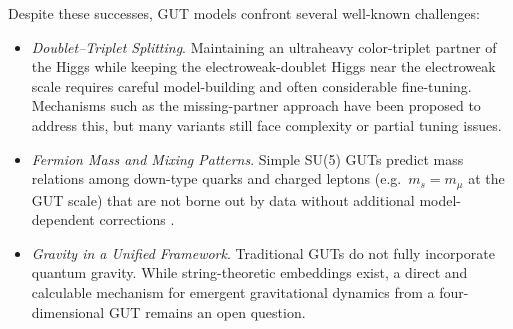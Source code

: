 \documentclass[aps,prd,preprint,groupedaddress]{revtex4-2}
\begin{document}
Despite these successes, GUT models confront several well-known challenges:
\begin{itemize}
    \item \emph{Doublet--Triplet Splitting}. Maintaining an ultraheavy color-triplet partner of the Higgs while keeping the electroweak-doublet Higgs near the electroweak scale requires careful model-building and often considerable fine-tuning.  Mechanisms such as the missing-partner approach \cite{dimopoulos1982missing} have been proposed to address this, but many variants still face complexity or partial tuning issues.
    \item \emph{Fermion Mass and Mixing Patterns}. Simple SU(5) GUTs predict mass relations among down-type quarks and charged leptons (e.g.\ $m_s = m_\mu$ at the GUT scale) that are not borne out by data without additional model-dependent corrections \cite{georgi1979flavor}.
    \item \emph{Gravity in a Unified Framework}. Traditional GUTs do not fully incorporate quantum gravity.  While string-theoretic embeddings exist, a direct and calculable mechanism for emergent gravitational dynamics from a four-dimensional GUT remains an open question.
\end{itemize}
\end{document}
